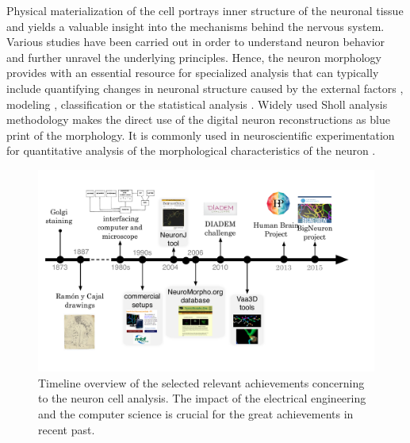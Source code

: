 Physical materialization of the cell portrays inner structure of the neuronal tissue and yields a valuable insight into the mechanisms behind the nervous system. Various studies have been carried out in order to understand neuron behavior and further unravel the underlying principles. Hence, the neuron morphology provides with an essential resource for specialized analysis that can typically include quantifying changes in neuronal structure caused by the external factors \cite{gomez2007immobilized,koppes2011neurite}, modeling \cite{ascoli2001computer}, classification \cite{armananzas2015towards} or the statistical analysis \cite{samsonovich2005statistical}. Widely used Sholl analysis methodology \cite{sholl1953dendritic} makes the direct use of the digital neuron reconstructions as blue print of the morphology. It is commonly used in neuroscientific experimentation for quantitative analysis of the morphological characteristics of the neuron \cite{garcia2014new}. 

\begin{figure}
	\begin{center}
		\includegraphics[width=\textwidth]{ch1_fig1}
	\end{center}
	\caption{Timeline overview of the selected relevant achievements concerning to the neuron cell analysis. The impact of the electrical engineering and the computer science is crucial for the great achievements in recent past.}
	\label{ch1_fig1}
\end{figure}

